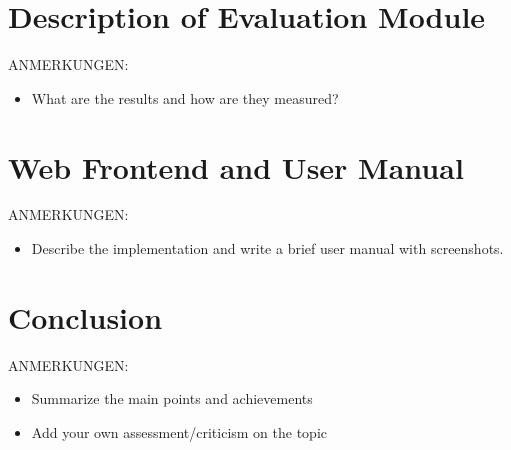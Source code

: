 \documentclass[12pt]%
{article}
\begin{document}
\section{Description of Evaluation Module}
ANMERKUNGEN:
\begin{itemize}
\item What are the results and how are they measured?
\end{itemize}

\section{Web Frontend and User Manual}
ANMERKUNGEN:
\begin{itemize}
\item Describe the implementation and write a brief user manual with screenshots.
\end{itemize}

\section{Conclusion}
ANMERKUNGEN:
\begin{itemize}
\item Summarize the main points and achievements
\item Add your own assessment/criticism on the topic
\end{itemize}

\newpage

\printglossary[style=altlist,title=Glossary]
 
\printglossary[type=\acronymtype,style=long]
 
\printglossary[type=symbolslist,style=long]

\newpage




\nocite{*}
\end{document}
